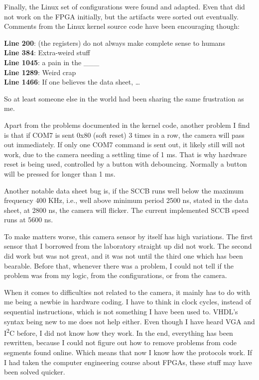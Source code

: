 \documentclass{IEEEtran}
\begin{document}
	Finally, the Linux set of configurations \cite{reg6} were found and adapted. Even that did not work on the FPGA initially, but the artifacts were sorted out eventually. Comments from the Linux kernel source code \cite{reg6} have been encouraging though: 
	\begin{displayquote}
		\textbf{Line 200}: (the registers) do not always make complete sense to humans\\
		\textbf{Line 384}: Extra-weird stuff\\
		\textbf{Line 1045}: a pain in the \_\_\_\\
		\textbf{Line 1289}: Weird crap\\
		\textbf{Line 1466}: If one believes the data sheet, …
	\end{displayquote}
	So at least someone else in the world had been sharing the same frustration as me.
	
	Apart from the problems documented in the kernel code, another problem I find is that if COM7 is sent 0x80 (soft reset) 3 times in a row, the camera will pass out immediately. If only one COM7 command is sent out, it likely still will not work, due to the camera needing a settling time of 1 ms. That is why hardware reset is being used, controlled by a button with debouncing. Normally a button will be pressed for longer than 1 ms.
	
	Another notable data sheet bug is, if the SCCB runs well below the maximum frequency 400 KHz, i.e., well above minimum period 2500 ns, stated in the data sheet, at 2800 ns, the camera will flicker. The current implemented SCCB speed runs at 5600 ns.
	
	To make matters worse, this camera sensor by itself has high variations. The first sensor that I borrowed from the laboratory straight up did not work. The second did work but was not great, and it was not until the third one which has been bearable. Before that, whenever there was a problem, I could not tell if the problem was from my logic, from the configurations, or from the camera.
	
	When it comes to difficulties not related to the camera, it mainly has to do with me being a newbie in hardware coding. I have to think in clock cycles, instead of sequential instructions, which is not something I have been used to. VHDL’s syntax being new to me does not help either. Even though I have heard VGA and I\textsuperscript{2}C before, I did not know how they work. In the end, everything has been rewritten, because I could not figure out how to remove problems from code segments found online. Which  means that now I know how the protocols work. If I had taken the computer engineering course about FPGAs, these stuff may have been solved quicker.
	
\end{document}
